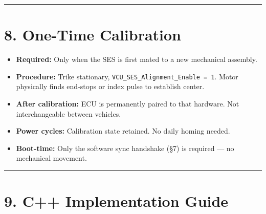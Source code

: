 \documentclass[12pt,a4paper,oneside]{report}
\providecommand{\tightlist}{\setlength{\itemsep}{0pt}\setlength{\parskip}{0pt}}
\begin{document}
\begin{center}\rule{0.5\linewidth}{0.5pt}\end{center}

\section{8. One-Time Calibration}\label{one-time-calibration}

\begin{itemize}
\tightlist
\item
  \textbf{Required:} Only when the SES is first mated to a new mechanical
  assembly.
\item
  \textbf{Procedure:} Trike stationary,
  \texttt{VCU\_SES\_Alignment\_Enable\ =\ 1}. Motor physically finds end-stops
  or index pulse to establish center.
\item
  \textbf{After calibration:} ECU is permanently paired to that hardware. Not
  interchangeable between vehicles.
\item
  \textbf{Power cycles:} Calibration state retained. No daily homing needed.
\item
  \textbf{Boot-time:} Only the software sync handshake (§7) is required --- no
  mechanical movement.
\end{itemize}

\begin{center}\rule{0.5\linewidth}{0.5pt}\end{center}

\section{9. C++ Implementation Guide}\label{c-implementation-guide}
\end{document}
